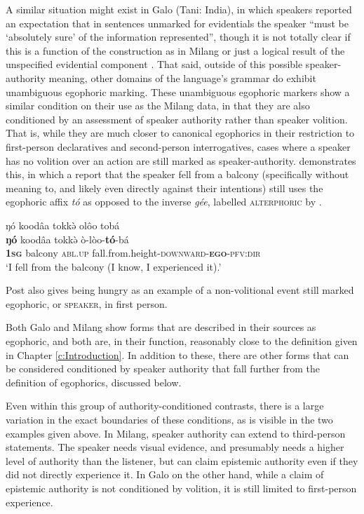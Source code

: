 A similar situation might exist in Galo (Tani: India), in which speakers reported an expectation that in sentences unmarked for evidentials the speaker ``must be `absolutely sure' of the information represented'', though it is not totally clear if this is a function of the construction as in Milang or just a logical result of the unspecified evidential component \cite[112]{Post2013}. That said, outside of this possible speaker-authority meaning, other domains of the language's grammar do exhibit unambiguous egophoric marking. These unambiguous egophoric markers show a similar condition on their use as the Milang data, in that they are also conditioned by an assessment of speaker authority rather than speaker volition. That is, while they are much closer to canonical egophorics in their restriction to first-person declaratives and second-person interrogatives, cases where a speaker has no volition over an action are still marked as speaker-authority.  demonstrates this, in which a report that the speaker fell from a balcony (specifically without meaning to, and likely even directly against their intentions) still uses the egophoric affix \textit{tó} as opposed to the inverse \textit{gée}, labelled \textsc{alterphoric} by .

\begin{exe}
        \ex \label{e:Description:GaloNonVolition}
        \glll ŋó koodâa tokkə̀ {olôo tobá} \\
        \textbf{ŋó} koodâa tokkə̀ ò-lòo-\textbf{tó}-bá \\
        \textbf{\textsc{1sg}} balcony \textsc{abl.up} fall.from.height-\textsc{downward}-\textsc{\textbf{ego}}-\textsc{pfv:dir} \\
        \glt `I fell from the balcony (I know, I experienced it).' \cite[Galo,][123, emphasis from source]{Post2013}
\end{exe}

Post also gives being hungry as an example of a non-volitional event still marked egophoric, or \textsc{speaker}, in first person.

Both Galo and Milang show forms that are described in their sources as egophoric, and both are, in their function, reasonably close to the definition given in Chapter \ref{c:Introduction}. In addition to these, there are other forms that can be considered conditioned by speaker authority that fall further from the definition of egophorics, discussed below.

Even within this group of authority-conditioned contrasts, there is a large variation in the exact boundaries of these conditions, as is visible in the two examples given above. In Milang, speaker authority can extend to third-person statements. The speaker needs visual evidence, and presumably needs a higher level of authority than the listener, but can claim epistemic authority even if they did not directly experience it. In Galo on the other hand, while a claim of epistemic authority is not conditioned by volition, it is still limited to first-person experience.

